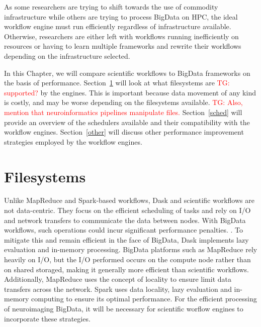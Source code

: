 \documentclass{report}
\newcommand{\tristan}[1]{\textcolor{red}{TG: #1}}
\newcommand{\weird}[1]{\uwave{#1}}
\begin{document}
        As some researchers are trying to shift towards the use of commodity 
        infrastructure while others are trying to process BigData on HPC, the 
        ideal workflow engine must run efficiently regardless of 
        infrastructure available. Otherwise, researchers are either left with
        workflows running inefficiently on resources or having to learn 
        multiple frameworks and rewrite their workflows depending on the 
        infrastructure selected.
 
        In this Chapter, we will compare scientific
        workflows to BigData frameworks on the basis of performance. 
        Section~\ref{fs} will look at what filesystems are \weird{required} \tristan{supported?} by the 
        engines. This is important because data movement of any kind is costly,
        and may be worse depending on the filesystems available. \tristan{Also, mention that neuroinformatics
        pipelines manipulate files.}
        Section~\ref{sched} will provide an overview of the schedulers 
        available and their compatibility with the workflow engines. 
        Section~\ref{other} will discuss other performance improvement 
        strategies employed by the workflow engines.
 
        \section{Filesystems}\label{fs}
            
            
            Unlike MapReduce and Spark-based workflows, Dask and scientific 
            workflows are not data-centric. They focus on the efficient 
            scheduling of tasks and rely on I/O and network transfers to
            communicate the data between nodes. With BigData workflows, such
            operations could incur significant performance penalties. 
            \weird{Filesystems}. To mitigate this and remain efficient in the face of
            BigData, Dask implements lazy evaluation and in-memory processing.
            BigData platforms such as MapReduce rely heavily on I/O, but the 
            I/O performed occurs on the compute node rather than on 
            shared storaged, making it generally more efficient than scientific
            workflows. Additionally, MapReduce uses the concept of 
            locality to ensure limit data transfers across the network. Spark
            uses data locality, lazy evaluation and in-memory computing to 
            ensure its optimal performance.
            For the efficient processing of neuroimaging BigData, it will be
            necessary for scientific worflow engines to incorporate these 
            strategies.
        
\end{document}
